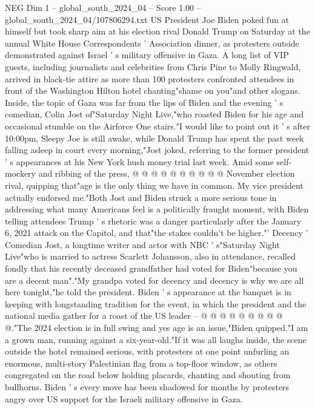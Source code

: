 \begin{textsample}{NEG Dim 1 – global\_south\_2024\_04 – Score 1.00 – global\_south\_2024\_04/107806294.txt}  \label{ex:f1_neg_409}
US President Joe Biden poked fun at himself but took sharp aim at his election rival Donald Trump on Saturday at the annual White House Correspondents ' Association dinner, as protesters outside demonstrated against Israel ' s military offensive in Gaza.
A long list of VIP guests, including journalists and celebrities from Chris Pine to Molly Ringwald, arrived in black-tie attire as more than 100 protesters confronted attendees in front of the Washington Hilton hotel chanting"shame on you"and other slogans.
Inside, the topic of Gaza was far from the lips of Biden and the evening ' s comedian, Colin Jost of"Saturday Night Live,"who roasted Biden for his age and occasional stumble on the Airforce One stairs."I would like to point out it ' s after 10:00pm, Sleepy Joe is still awake, while Donald Trump has spent the past week falling asleep in court every morning,"Jost joked, referring to the former president ' s appearances at his New York hush money trial last week.
Amid some self-mockery and ribbing of the press, @ @ @ @ @ @ @ @ @ @ November election rival, quipping that"age is the only thing we have in common.
My vice president actually endorsed me."Both Jost and Biden struck a more serious tone in addressing what many Americans feel is a politically fraught moment, with Biden telling attendees Trump ' s rhetoric was a danger particularly after the January 6, 2021 attack on the Capitol, and that"the stakes couldn't be higher."' Decency ' Comedian Jost, a longtime writer and actor with NBC ' s"Saturday Night Live"who is married to actress Scarlett Johansson, also in attendance, recalled fondly that his recently deceased grandfather had voted for Biden"because you are a decent man"."My grandpa voted for decency and decency is why we are all here tonight,"he told the president.
Biden ' s appearance at the banquet is in keeping with longstanding tradition for the event, in which the president and the national media gather for a roast of the US leader -- @ @ @ @ @ @ @ @ @ @."The 2024 election is in full swing and yes age is an issue,"Biden quipped."I am a grown man, running against a six-year-old."If it was all laughs inside, the scene outside the hotel remained serious, with protesters at one point unfurling an enormous, multi-story Palestinian flag from a top-floor window, as others congregated on the road below holding placards, chanting and shouting from bullhorns.
Biden ' s every move has been shadowed for months by protesters angry over US support for the Israeli military offensive in Gaza.

\end{textsample}
